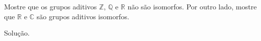 \begin{homeworkProblem}
  Mostre que os grupos aditivos $\mathbb{Z}$, $\mathbb{Q}$ e $\mathbb{R}$ não são isomorfos. Por outro lado, mostre que $\mathbb{R}$ e $\mathbb{C}$ são grupos aditivos isomorfos.
  \begin{solution}
    Solução.
  \end{solution}
\end{homeworkProblem}
